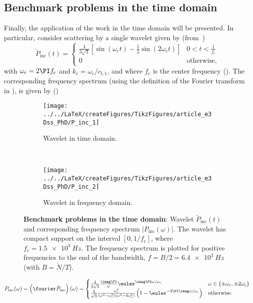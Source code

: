 \subsection{Benchmark problems in the time domain}
Finally, the application of the work in the time domain will be presented. In particular, consider scattering by a single wavelet given by (from~\cite[p. 633]{Jensen2011coa})
\begin{equation}\label{Eq1:Pb_inc}
	\breve{P}_{\mathrm{inc}}(t) = \begin{cases} \frac{4}{3\sqrt{3}} \left[\sin(\omega_{\mathrm{c}} t)-\frac12 \sin\left(2\omega_{\mathrm{c}} t\right)\right] & 0 < t < \frac{1}{f_{\mathrm{c}}}\\
	0 & \text{otherwise},\end{cases}
\end{equation}
with $\omega_{\mathrm{c}} = 2\PI f_{\mathrm{c}}$ and $k_{\mathrm{c}} = \omega_{\mathrm{c}}/c_{\mathrm{f},1}$, and where $f_{\mathrm{c}}$ is the center frequency  (). The corresponding frequency spectrum (using the definition of the Fourier transform in ), is given by ()
\begin{figure}
	\centering
	\begin{subfigure}[t]{0.48\textwidth}
		\centering
		\texttt{[image: ../../LaTeX/createFigures/TikzFigures/article\_e3Dss\_PhD/P\_inc\_1]}
		\caption{Wavelet in time domain.}
		\label{Fig1:Pb_inc}
	\end{subfigure}
	~
	\begin{subfigure}[t]{0.48\textwidth}
		\centering
		\texttt{[image: ../../LaTeX/createFigures/TikzFigures/article\_e3Dss\_PhD/P\_inc\_2]}
		\caption{Wavelet in frequency domain.}
		\label{Fig1:P_inc}
	\end{subfigure}
	\caption{\textbf{Benchmark problems in the time domain}: Wavelet $\breve{P}_{\mathrm{inc}}(t)$ and corresponding frequency spectrum $|P_{\mathrm{inc}}(\omega)|$. The wavelet has compact support on the interval $[0,1/f_{\mathrm{c}}]$, where $f_{\mathrm{c}}=\SI{1.5e3}{Hz}$. The frequency spectrum is plotted for positive frequencies to the end of the bandwidth, $f=B/2=\SI{6.4e3}{Hz}$ (with $B=\check{N}/T$).}
\end{figure}
\begin{equation}
	P_{\mathrm{inc}}(\omega) = \left(\fourier\breve{P}_{\mathrm{inc}}\right)(\omega) = \begin{cases}
		\frac{4}{3\sqrt{3}}\frac{\imag\PI}{\omega}\euler^{\imag\PI\omega/\omega_{\mathrm{c}}} & \omega \in\{\pm\omega_{\mathrm{c}},\pm 2\omega_{\mathrm{c}}\}\\
		\frac{4}{\sqrt{3}}\frac{\omega_{\mathrm{c}}^3}{\left(\omega^2-\omega_{\mathrm{c}}^2\right)\left(\omega^2-4\omega_{\mathrm{c}}^2\right)}\left(1-\euler^{-2\PI\imag\omega/\omega_{\mathrm{c}}}\right) & \text{otherwise.}
		\end{cases}
\end{equation}
